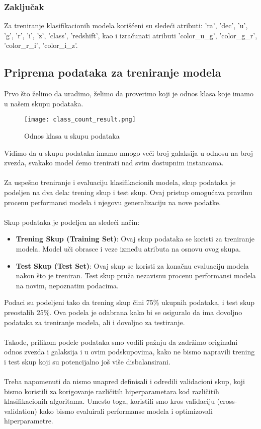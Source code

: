 \documentclass[a4paper,12pt]{article}
\begin{document}
\subsubsection{Zaključak}
Za treniranje klasifikacionih modela korišćeni su sledeći atributi: 'ra', 'dec', 'u', 'g', 'r', 'i', 'z', 'class', 'redshift', kao i izračunati atributi 'color\_u\_g', 'color\_g\_r', 'color\_r\_i', 'color\_i\_z'.

\clearpage


\subsection{Priprema podataka za treniranje modela}

Prvo što želimo da uradimo, želimo da proverimo koji je odnos klasa koje imamo u našem skupu podataka.

\begin{figure}[H]
\centering
\texttt{[image: class\_count\_result.png]}
\caption{Odnos klasa u skupu podataka}
\label{fig:sql_query}
\end{figure}

Vidimo da u skupu podataka imamo mnogo veći broj galaksija u odnosu na broj zvezda, svakako model ćemo trenirati nad svim dostupnim instancama.
\\\\Za uspešno treniranje i evaluaciju klasifikacionih modela, skup podataka je podeljen na dva dela: trening skup i test skup. Ovaj pristup omogućava pravilnu procenu performansi modela i njegovu generalizaciju na nove podatke.
\\\\Skup podataka je podeljen na sledeći način:
\begin{itemize}
    \item \textbf{Trening Skup (Training Set)}: Ovaj skup podataka se koristi za treniranje modela. Model uči obrasce i veze između atributa na osnovu ovog skupa.
    \item \textbf{Test Skup (Test Set)}: Ovaj skup se koristi za konačnu evaluaciju modela nakon što je treniran. Test skup pruža nezavisnu procenu performansi modela na novim, nepoznatim podacima.
\end{itemize}

Podaci su podeljeni tako da trening skup čini 75\% ukupnih podataka, i test skup preostalih 25\%. Ova podela je odabrana kako bi se osiguralo da ima dovoljno podataka za treniranje modela, ali i dovoljno za testiranje.\\\\
Takođe, prilikom podele podataka smo vodili pažnju da zadržimo originalni odnos zvezda i galaksija i u ovim podskupovima, kako ne bismo napravili trening i test skup koji su potencijalno još više disbalansirani.\\\\
Treba napomenuti da nismo unapred definisali i odredili validacioni skup, koji bismo koristili za korigovanje različitih hiperparametara kod različitih klasifikacionih algoritama. Umesto toga, koristili smo kros validaciju (cross-validation) kako bismo evaluirali performanse modela i optimizovali hiperparametre.
\end{document}
